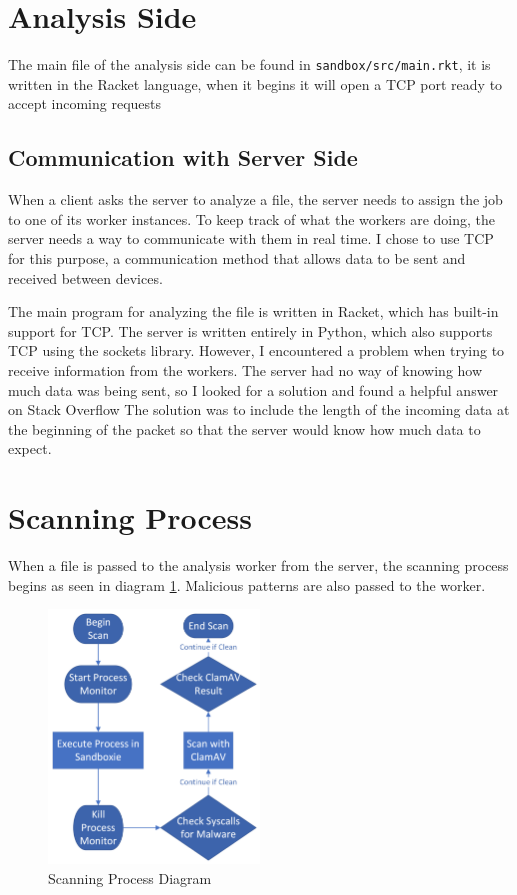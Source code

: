 \section{Analysis Side}
The main file of the analysis side can be found in \texttt{sandbox/src/main.rkt},
it is written in the Racket language, when it begins it will open a TCP port ready to accept incoming requests

\subsection{Communication with Server Side}
When a client asks the server to analyze a file,
the server needs to assign the job to one of its worker instances.
To keep track of what the workers are doing,
the server needs a way to communicate with them in real time.
I chose to use TCP for this purpose,
a communication method that allows data to be sent and received between devices.

The main program for analyzing the file is written in Racket,
which has built-in support for TCP. The server is written entirely in Python,
which also supports TCP using the sockets library.
However, I encountered a problem when trying to receive information from the workers.
The server had no way of knowing how much data was being sent,
so I looked for a solution and found a
helpful answer on Stack Overflow \cite{chqrlie:2022}
The solution was to include the length of the incoming
data at the beginning of the packet
so that the server would know how much data to expect.

\section{Scanning Process}
When a file is passed to the analysis worker from the server,
the scanning process begins as seen in diagram \ref{image:scanningProcess}.
Malicious patterns are also passed to the worker.

\begin{figure}[h!]
    \centering
    \includegraphics[width=0.5\textwidth]{images/diagrams/scan_process}
    \caption{Scanning Process Diagram}
    \label{image:scanningProcess}
\end{figure}

